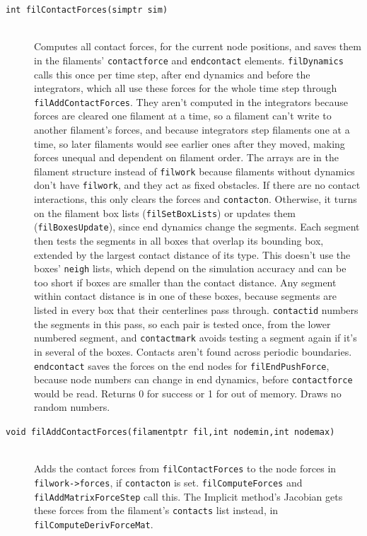 \documentclass {scrbook}
\newcommand {\ttt} {\texttt}
\begin{document}
\begin{description}
\item[\ttt{int filContactForces(simptr sim)}] %
\hfill \\
Computes all contact forces, for the current node positions, and saves them in the filaments' \ttt{contactforce} and \ttt{endcontact} elements. \ttt{filDynamics} calls this once per time step, after end dynamics and before the integrators, which all use these forces for the whole time step through \ttt{filAddContactForces}. They aren't computed in the integrators because forces are cleared one filament at a time, so a filament can't write to another filament's forces, and because integrators step filaments one at a time, so later filaments would see earlier ones after they moved, making forces unequal and dependent on filament order. The arrays are in the filament structure instead of \ttt{filwork} because filaments without dynamics don't have \ttt{filwork}, and they act as fixed obstacles. If there are no contact interactions, this only clears the forces and \ttt{contacton}. Otherwise, it turns on the filament box lists (\ttt{filSetBoxLists}) or updates them (\ttt{filBoxesUpdate}), since end dynamics change the segments. Each segment then tests the segments in all boxes that overlap its bounding box, extended by the largest contact distance of its type. This doesn't use the boxes' \ttt{neigh} lists, which depend on the simulation accuracy and can be too short if boxes are smaller than the contact distance. Any segment within contact distance is in one of these boxes, because segments are listed in every box that their centerlines pass through. \ttt{contactid} numbers the segments in this pass, so each pair is tested once, from the lower numbered segment, and \ttt{contactmark} avoids testing a segment again if it's in several of the boxes. Contacts aren't found across periodic boundaries. \ttt{endcontact} saves the forces on the end nodes for \ttt{filEndPushForce}, because node numbers can change in end dynamics, before \ttt{contactforce} would be read. Returns 0 for success or 1 for out of memory. Draws no random numbers.

\item[\ttt{void filAddContactForces(filamentptr fil,int nodemin,int nodemax)}] %
\hfill \\
Adds the contact forces from \ttt{filContactForces} to the node forces in \ttt{filwork->forces}, if \ttt{contacton} is set. \ttt{filComputeForces} and \ttt{filAddMatrixForceStep} call this. The Implicit method's Jacobian gets these forces from the filament's \ttt{contacts} list instead, in \ttt{filComputeDerivForceMat}.


\end{description}
\end{document}
